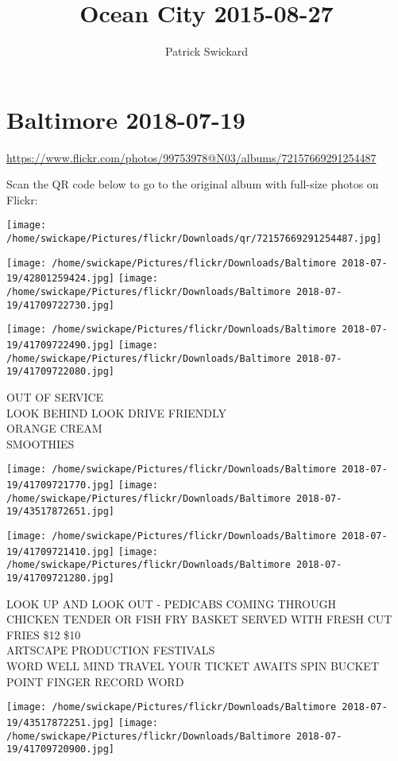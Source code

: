 \documentclass[10pt,letterpaper]{article}
\title{Ocean City 2015-08-27}
\author{Patrick Swickard}
\date{}
\begin{document}
\section*{Baltimore 2018-07-19}

\url{https://www.flickr.com/photos/99753978@N03/albums/72157669291254487}

Scan the QR code below to go to the original album with full-size photos on Flickr:

\texttt{[image: /home/swickape/Pictures/flickr/Downloads/qr/72157669291254487.jpg]}
\pagebreak

\texttt{[image: /home/swickape/Pictures/flickr/Downloads/Baltimore 2018-07-19/42801259424.jpg]}
\texttt{[image: /home/swickape/Pictures/flickr/Downloads/Baltimore 2018-07-19/41709722730.jpg]}

\texttt{[image: /home/swickape/Pictures/flickr/Downloads/Baltimore 2018-07-19/41709722490.jpg]}
\texttt{[image: /home/swickape/Pictures/flickr/Downloads/Baltimore 2018-07-19/41709722080.jpg]}

OUT OF SERVICE\\
LOOK BEHIND LOOK DRIVE FRIENDLY\\
ORANGE CREAM\\
SMOOTHIES
\pagebreak

\texttt{[image: /home/swickape/Pictures/flickr/Downloads/Baltimore 2018-07-19/41709721770.jpg]}
\texttt{[image: /home/swickape/Pictures/flickr/Downloads/Baltimore 2018-07-19/43517872651.jpg]}

\texttt{[image: /home/swickape/Pictures/flickr/Downloads/Baltimore 2018-07-19/41709721410.jpg]}
\texttt{[image: /home/swickape/Pictures/flickr/Downloads/Baltimore 2018-07-19/41709721280.jpg]}

LOOK UP AND LOOK OUT {-} PEDICABS COMING THROUGH\\
CHICKEN TENDER OR FISH FRY BASKET SERVED WITH FRESH CUT FRIES \$12 \$10\\
ARTSCAPE PRODUCTION FESTIVALS\\
WORD WELL MIND TRAVEL YOUR TICKET AWAITS SPIN BUCKET POINT FINGER RECORD WORD
\pagebreak

\texttt{[image: /home/swickape/Pictures/flickr/Downloads/Baltimore 2018-07-19/43517872251.jpg]}
\texttt{[image: /home/swickape/Pictures/flickr/Downloads/Baltimore 2018-07-19/41709720900.jpg]}
\end{document}
